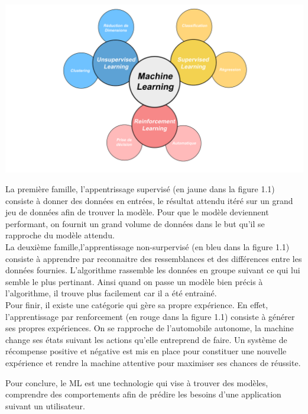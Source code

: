 \documentclass[12pt,a4paper]{report}
\begin{document}
\begin{center}
	\includegraphics[scale=0.2]{ML_vignette}
	\label{fig1}
\end{center}

La première famille, l'appentrissage supervisé (en jaune dans la figure 1.1) consiste à donner des données en entrées, le résultat attendu itéré sur un grand jeu de données afin de trouver la modèle. Pour que le modèle deviennent performant, on fournit un grand volume de données dans le but qu'il se rapproche du modèle attendu.\\

La deuxième famille,l'apprentissage non-surpervisé (en bleu dans la figure 1.1) consiste à apprendre par reconnaitre des ressemblances et des différences entre les données fournies. L'algorithme rassemble les données en groupe suivant ce qui lui semble le plus pertinant. Ainsi quand on passe un modèle bien précis à l'algorithme, il trouve plus facilement car il a été entrainé.\\

Pour finir, il existe une catégorie qui gère sa propre expérience. En effet, l'apprentissage par renforcement (en rouge dans la figure 1.1) consiste à générer ses propres expériences. On se rapproche de l'automobile autonome, la machine change ses états suivant les actions qu'elle entreprend de faire. Un système de récompense positive et négative est mis en place pour constituer une nouvelle expérience et rendre la machine attentive pour maximiser ses chances de réussite.\\
\pagebreak

Pour conclure, le ML est une technologie qui vise à trouver des modèles, comprendre des comportements afin de prédire les besoins d'une application suivant un utilisateur.\\
\end{document}
